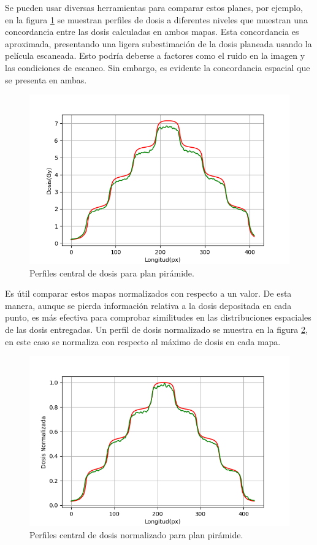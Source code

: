 Se pueden usar diversas herramientas para comparar estos planes, por ejemplo, en la figura \ref{fig:perfilesDosisPiramide} se muestran perfiles de dosis a diferentes niveles que muestran una concordancia entre las dosis calculadas en ambos mapas. Esta concordancia es aproximada, presentando una ligera subestimación de la dosis planeada usando la película escaneada. Esto podría deberse a factores como el ruido en la imagen y las condiciones de escaneo. Sin embargo, es evidente la concordancia espacial que se presenta en ambas.\\
\begin{figure}[H]
	\centering
	\includegraphics[width=0.7\linewidth]{images/perfilCentralPiramide.png}
	
	\caption{Perfiles central de dosis para plan pirámide. }
	\label{fig:perfilesDosisPiramide}
\end{figure}
Es útil comparar estos mapas normalizados con respecto a un valor. De esta manera, aunque se pierda información relativa a la dosis depositada en cada punto, es más efectiva para comprobar similitudes en las distribuciones espaciales de las dosis entregadas. Un perfil de dosis normalizado se muestra en la figura \ref{fig:perfilesDosisPiramideNorm}, en este caso se normaliza con respecto al máximo de dosis en cada mapa.\\
\begin{figure}[H]
	\centering
	\includegraphics[width=0.7\linewidth]{images/perfilPiramideNormalizado.png}
	
	\caption{Perfiles central de dosis normalizado para plan pirámide. }
	\label{fig:perfilesDosisPiramideNorm}
\end{figure}

